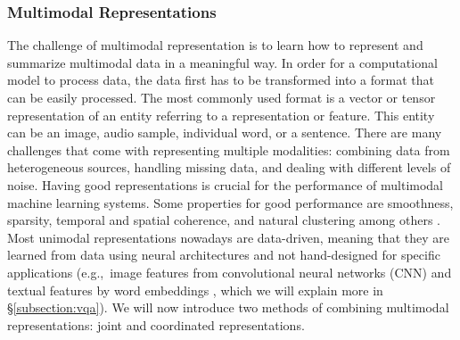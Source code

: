 \documentclass{article}
\begin{document}
\subsubsection{Multimodal Representations}

The challenge of multimodal representation is to learn how to represent and summarize multimodal data in a meaningful way. In order for a computational model to process data, the data first has to be transformed into a format that can be easily processed. The most commonly used format is a vector or tensor representation of an entity referring to a representation or feature. This entity can be an image, audio sample, individual word, or a sentence. There are many challenges that come with representing multiple modalities: combining data from heterogeneous sources, handling missing data, and dealing with different levels of noise. Having good representations is crucial for the performance of multimodal machine learning systems. Some properties for good performance are smoothness, sparsity, temporal and spatial coherence, and natural clustering among others \citep{bengio2013represent}. Most unimodal representations nowadays are data-driven, meaning that they are learned from data using neural architectures and not hand-designed for specific applications (e.g.,\ image features from convolutional neural networks (CNN) \citep{krizhevsky2012imagenet} and textual features by word embeddings \citep{mikolov2013distri}, which we will explain more in \S \ref{subsection:vqa}). We will now introduce two methods of combining multimodal representations: joint and coordinated representations.
\end{document}

